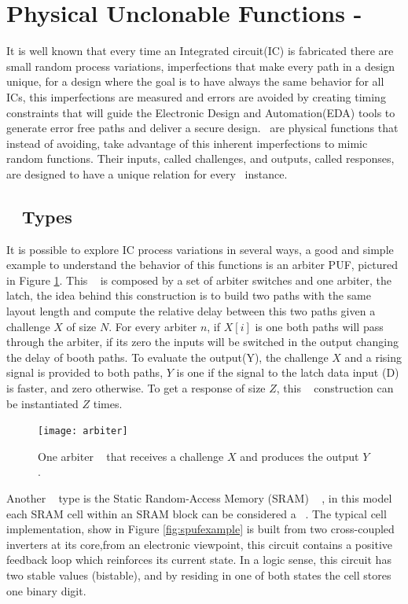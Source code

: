 \section{Physical Unclonable Functions - \pufs~}
\label{sec:pufs}
It is well known that every time an Integrated circuit(IC) is fabricated there are small random process variations, imperfections that make every path in a design unique, for a design where the goal is to have always the same behavior for all ICs, this imperfections are measured and errors are avoided by creating timing constraints that will guide the Electronic Design and Automation(EDA) tools to  generate error free paths and deliver a secure design. \pufs~are physical functions that instead of avoiding, take advantage of this inherent imperfections to mimic random functions. Their inputs, called challenges, and outputs, called responses, are designed to have a unique relation for every \puf~instance. 

\subsection{\puf~ Types}
It is possible to explore IC process variations in several ways\cite{DBLP:phdbasesearchMaes12}, a good and simple example to understand the behavior of this functions is an arbiter PUF, pictured in Figure \ref{fig:arbiterpuf}.
This \puf~ is composed by a set of arbiter switches and  one arbiter, the latch, the idea behind this construction is to build two paths with the same layout length and compute the relative delay between this two paths given a challenge $X$ of size $N$.  For every arbiter $n$, if $X[i]$  is one both paths will pass through the arbiter, if its zero the inputs will be switched in the output  changing the delay of booth paths. To evaluate the output(Y), the challenge $X$ and a rising signal is provided to both paths, $Y$ is one if the signal to the latch data input (D) is faster, and zero otherwise. To get a response of size $Z$, this \puf~ construction  can be instantiated $Z$ times.

\begin{figure}[!ht]
	\centering
	\texttt{[image: arbiter]}
	\caption{One arbiter \puf~ that receives a challenge $X$ and produces the output $Y$.}
	\label{fig:arbiterpuf}
\end{figure}

Another \puf~ type is the Static Random-Access Memory (SRAM) \puf~ \cite{Leest2012}, in this model each SRAM cell within an SRAM block can be considered a \puf~. The typical cell implementation, show in Figure \ref{fig:spufexample} is built from two cross-coupled inverters at its core,from an electronic viewpoint, this circuit contains a positive feedback loop which reinforces its current state. In a logic sense, this circuit has two stable values (bistable), and by residing in one of both states the cell stores one binary digit.

